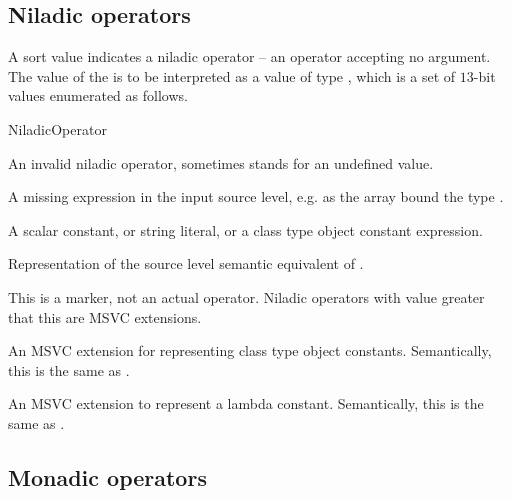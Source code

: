 \subsection{Niladic operators}
\label{sec:ifc:OperatorSort:Niladic}

A sort value  indicates a niladic operator -- 
an operator accepting no argument.  The
value of the  is to be interpreted as a value of type 
, which is a set of $13$-bit values enumerated as follows.
%
\begin{Enumeration}{NiladicOperator}

	\setcounter{enumi}{1023}
\end{Enumeration}

An invalid niladic operator, sometimes stands for an undefined value.

A missing expression in the input source level, e.g. as the array bound the type .

A scalar constant, or string literal, or a class type object constant expression.

Representation of the source level semantic equivalent of .

This is a marker, not an actual operator. Niladic operators with 
value greater that this are MSVC extensions.

An MSVC extension for representing class type object constants.
Semantically, this is the same as .


An MSVC extension to represent a lambda constant.
Semantically, this is the same as .



\subsection{Monadic operators}
\label{sec:ifc:OperatorSort:Monadic}


